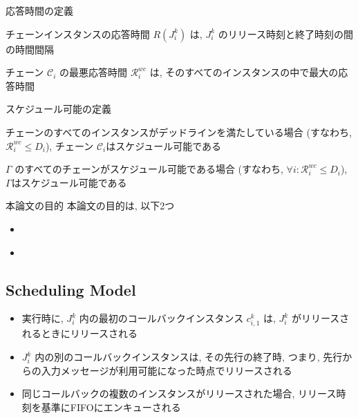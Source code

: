 \begin{frame}{応答時間の定義}
    \begin{definition}
        チェーンインスタンスの応答時間 $R\left(J_{i}^{k}\right)$ は,  $J_{i}^{k}$ のリリース時刻と終了時刻の間の時間間隔
    \end{definition}
    \begin{definition}
        チェーン $\mathcal{C}_{i}$ の最悪応答時間 $\mathcal{R}_{i}^{w c}$ は, そのすべてのインスタンスの中で最大の応答時間
    \end{definition}
\end{frame}

\begin{frame}{スケジュール可能の定義}
    \begin{definition}
        チェーンのすべてのインスタンスがデッドラインを満たしている場合 (すなわち, $\mathcal{R}_{i}^{w c} \leq D_{i}$), チェーン $\mathcal{C}_{i}$はスケジュール可能である
    \end{definition}
    \begin{definition}
        $\Gamma$ のすべてのチェーンがスケジュール可能である場合 (すなわち, $\forall i: \mathcal{R}_{i}^{w c} \leq D_{i}$), $\Gamma$はスケジュール可能である
    \end{definition}
\end{frame}

\begin{frame}{本論文の目的}
    本論文の目的は, 以下2つ
    \begin{itemize}
        \item {}
        \item {} \\
    \end{itemize}
\end{frame}


\subsection{Scheduling Model}
\label{ssec: scheduling_model}


\begin{frame}{}
    \begin{itemize}
        \item 実行時に, $J_{i}^{k}$ 内の最初のコールバックインスタンス $c_{i, 1}^{k}$ は, $J_{i}^{k}$ がリリースされるときにリリースされる
        \item $J_{i}^{k}$ 内の別のコールバックインスタンスは, その先行の終了時, つまり, 先行からの入力メッセージが利用可能になった時点でリリースされる
        \item 同じコールバックの複数のインスタンスがリリースされた場合, リリース時刻を基準にFIFOにエンキューされる
    \end{itemize}
\end{frame}


